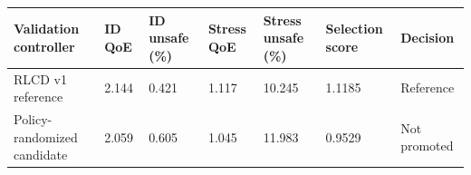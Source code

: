 \begin{tabular}{lllllll}
\toprule
Validation controller & ID QoE & ID unsafe (\%) & Stress QoE & Stress unsafe (\%) & Selection score & Decision \\
\midrule
RLCD v1 reference & 2.144 & 0.421 & 1.117 & 10.245 & 1.1185 & Reference \\
Policy-randomized candidate & 2.059 & 0.605 & 1.045 & 11.983 & 0.9529 & Not promoted \\
\bottomrule
\end{tabular}
